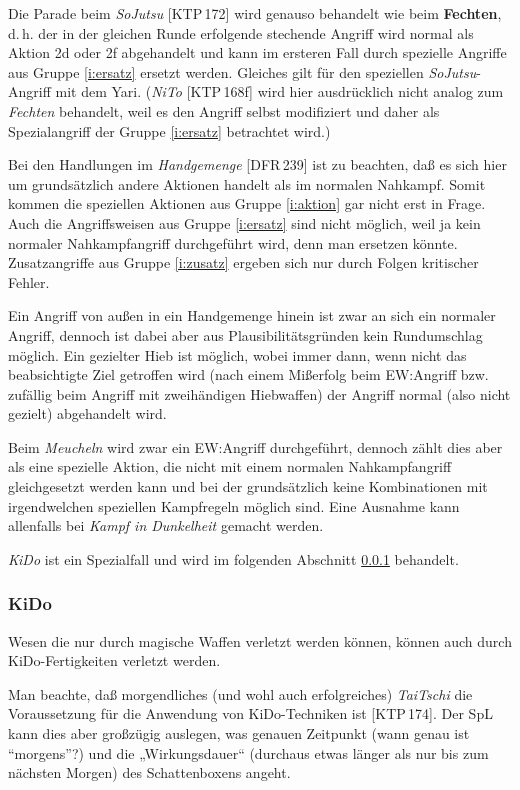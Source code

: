 \documentclass[10pt,a4paper,germanpar]{article}
\begin{document}
Die Parade beim \emph{SoJutsu} [KTP\,172] wird genauso behandelt wie beim
\textbf{Fechten}, d.\,h. der in der gleichen Runde erfolgende
stechende Angriff wird normal als Aktion 2d oder 2f abgehandelt und
kann im ersteren Fall durch spezielle Angriffe aus Gruppe
\ref{i:ersatz} ersetzt werden. Gleiches gilt für den speziellen
\emph{SoJutsu}-Angriff mit dem Yari. (\emph{NiTo} [KTP\,168f] wird
hier ausdrücklich nicht analog zum \emph{Fechten} behandelt, weil es
den Angriff selbst modifiziert und daher als Spezialangriff der Gruppe
\ref{i:ersatz} betrachtet wird.)

Bei den Handlungen im \emph{Handgemenge} [DFR\,239] ist zu beachten,
daß es sich hier um grundsätzlich andere Aktionen handelt als im
normalen Nahkampf. Somit kommen die speziellen Aktionen aus Gruppe
\ref{i:aktion} gar nicht erst in Frage. Auch die Angriffsweisen aus
Gruppe \ref{i:ersatz} sind nicht möglich, weil ja kein normaler
Nahkampfangriff durchgeführt wird, denn man ersetzen
könnte. Zusatzangriffe aus Gruppe \ref{i:zusatz} ergeben sich nur
durch Folgen kritischer Fehler.

Ein Angriff von außen in ein Handgemenge hinein ist zwar an sich ein
normaler Angriff, dennoch ist dabei aber aus Plausibilitätsgründen
kein Rundumschlag möglich. Ein gezielter Hieb ist möglich, wobei immer
dann, wenn nicht das beabsichtigte Ziel getroffen wird (nach einem
Mißerfolg beim EW:Angriff bzw. zufällig beim Angriff mit zweihändigen
Hiebwaffen) der Angriff normal (also nicht gezielt) abgehandelt wird.

Beim \emph{Meucheln} wird zwar ein EW:Angriff durchgeführt, dennoch
zählt dies aber als eine spezielle Aktion, die nicht mit einem
normalen Nahkampfangriff gleichgesetzt werden kann und bei der
grundsätzlich keine Kombinationen mit irgendwelchen speziellen
Kampfregeln möglich sind. Eine Ausnahme kann allenfalls bei
\emph{Kampf in Dunkelheit} gemacht werden.

\emph{KiDo} ist ein Spezialfall und wird im folgenden Abschnitt
\ref{kido} behandelt.

\subsubsection{KiDo}
\label{kido}

Wesen die nur durch magische Waffen verletzt werden können, können
auch durch KiDo-Fertigkeiten verletzt werden.

Man beachte, daß morgendliches (und wohl auch erfolgreiches)
\emph{TaiTschi} die Voraussetzung für die Anwendung von KiDo-Techniken
ist [KTP\,174]. Der SpL kann dies aber großzügig auslegen, was genauen
Zeitpunkt (wann genau ist "`morgens"'?) und die „Wirkungsdauer“
(durchaus etwas länger als nur bis zum nächsten Morgen) des
Schattenboxens angeht.
\end{document}
